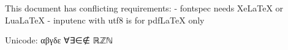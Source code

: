\documentclass{article}
\begin{document}
This document has conflicting requirements:
- fontspec needs XeLaTeX or LuaLaTeX
- inputenc with utf8 is for pdfLaTeX only

Unicode: αβγδε ∀∃∈∉ ℝℤℕ

\setmainfont{Times New Roman}  %
\end{document}
